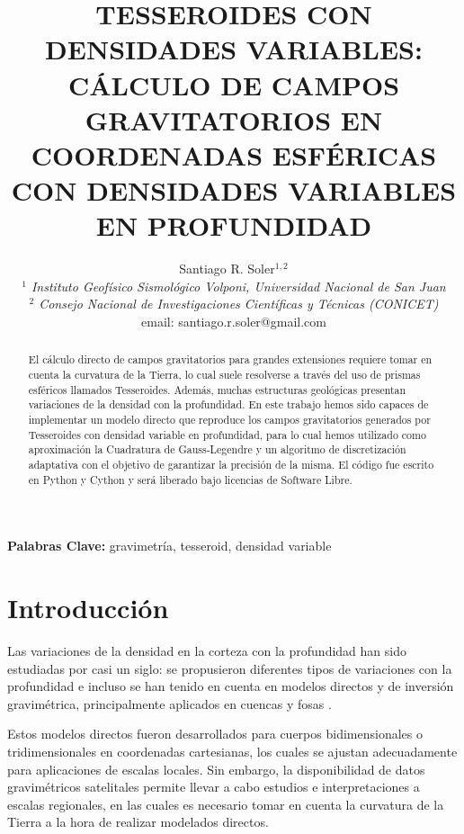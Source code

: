 \documentclass[a4paper,10pt]{article}
\title{
    \textbf{
    TESSEROIDES CON DENSIDADES VARIABLES:
    CÁLCULO DE CAMPOS GRAVITATORIOS EN COORDENADAS ESFÉRICAS CON
    DENSIDADES VARIABLES EN PROFUNDIDAD
    }
}
\author{
    Santiago R. Soler$^{1,2}$ \vspace{0.5em} \\ 
    \normalsize{\textit{$^1$ Instituto Geofísico Sismológico Volponi, Universidad Nacional de San Juan}} \\
    \normalsize{\textit{$^2$ Consejo Nacional de Investigaciones Científicas y Técnicas (CONICET)}} \vspace{0.4em} \\
    \normalsize{email: santiago.r.soler@gmail.com}
}
\date{}
\begin{document}
\renewcommand{\tablename}{Tabla}

\maketitle

\vspace{-2.5em}
\begin{center}
\textbf{Palabras Clave:} gravimetría, tesseroid, densidad variable
\end{center}
\vspace{0.5em}

\begin{abstract}
El cálculo directo de campos gravitatorios para grandes extensiones requiere tomar en cuenta la curvatura de la Tierra, lo cual suele resolverse a través del uso de prismas esféricos llamados Tesseroides.
Además, muchas estructuras geológicas presentan variaciones de la densidad con la profundidad.
En este trabajo hemos sido capaces de implementar un modelo directo que reproduce los campos gravitatorios generados por Tesseroides con densidad variable en profundidad, para lo cual hemos utilizado como aproximación la Cuadratura de Gauss-Legendre y un algoritmo de discretización adaptativa con el objetivo de garantizar la precisión de la misma.
El código fue escrito en Python y Cython y será liberado bajo licencias de Software Libre.

\end{abstract}


\section{Introducción}

Las variaciones de la densidad en la corteza con la profundidad han sido estudiadas por casi un siglo: se propusieron diferentes tipos de variaciones con la profundidad \citep{Athy1930, Maxant1980, Rao1986, Rao1993, Rao1994} e incluso se han tenido en cuenta en modelos directos y de inversión gravimétrica, principalmente aplicados en cuencas y fosas \citep{Cordell1973, Rao1986, Cowie1990, Rao1993, Rao1994, Zhang2001, Welford2010}.

Estos modelos directos fueron desarrollados para cuerpos bidimensionales o tridimensionales en coordenadas cartesianas, los cuales se ajustan adecuadamente para aplicaciones de escalas locales.
Sin embargo, la disponibilidad de datos gravimétricos satelitales permite llevar a cabo estudios e interpretaciones a escalas regionales, en las cuales es necesario tomar en cuenta la curvatura de la Tierra a la hora de realizar modelados directos. 
\end{document}
